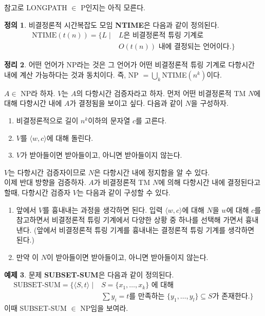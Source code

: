 \documentclass[b5paper, 11pt]{book}
\theoremstyle{definition}
\newtheorem{defn}{정의}[chapter]
\newtheorem{thm}[defn]{정리}
\newtheorem{ex}[defn]{예제}
\newenvironment{pf*}{\pushQED{\qed}\pf}
{\popQED\endpf}
\begin{document}
참고로 LONGPATH $\in $ P인지는 아직 모른다.
\begin{defn}
    비결정론적 시간복잡도 모임 \textbf{NTIME}은 다음과 같이 정의된다. 
    \begin{align*}
        \text{NTIME}(t(n)) = \{L \;\vert\; &L\text{은 비결정론적 튜링 기계로 } \\ &O(t(n)) \text{ 내에 
        결정되는 언어이다.} \}
    \end{align*}
\end{defn}
\begin{thm}
    어떤 언어가 NP라는 것은 그 언어가 어떤 비결정론적 튜링 기계로 다항시간 내에 계산 가능하다는 것과 동치이다.
    즉, NP $= \bigcup_k$NTIME$(n^k)$이다.
\end{thm}
\begin{pf*}
    $A \in $ NP라 하자. $V$는 $A$의 다항시간 검증자라고 하자. 
    먼저 어떤 비결정론적 TM $N$에 대해 다항시간 내에 $A$가 결정됨을 보이고 싶다.
    다음과 같이 $N$을 구성하자.
    \begin{enumerate}
        \item 비결정론적으로 길이 $n^k$이하의 문자열 $c$를 고른다.
        \item $V$를 $\langle w,c \rangle$에 대해 돌린다.
        \item $V$가 받아들이면 받아들이고, 아니면 받아들이지 않는다. 
    \end{enumerate}
    $V$는 다항시간 검증자이므로 $N$은 다항시간 내에 정지함을 알 수 있다. \\ 
    이제 반대 방향을 검증하자. $A$가 비결정론적 TM $N$에 의해 다항시간 내에 결정된다고 할때, 다항시간
    검증자 $V$는 다음과 같이 구성할 수 있다.
    \begin{enumerate}
        \item 앞에서 $V$를 흉내내는 과정을 생각하면 된다. 입력 $\langle w,c \rangle$에 대해 $N$을 $w$에
        대해 $c$를 참고하면서 비결정론적 튜링 기계에서 다양한 상황 중 하나를 선택해 가면서 흉내낸다. (앞에서
        비결정론적 튜링 기계를 흉내내는 결정론적 튜링 기계를 생각하면 된다.) 
        \item 만약 이 $N$이 받아들이면 받아들이고, 아니면 받아들이지 않는다.
    \end{enumerate}
\end{pf*}
\begin{ex}
    문제 \textbf{SUBSET-SUM}은 다음과 같이 정의된다. 
    \begin{align*}
        \text{SUBSET-SUM} = \{\langle S, t \rangle \; \vert \; &S = \{x_1, \ldots , x_k\} \text{ 에 대해 }
        \\ &\sum y_i = t \text{를 만족하는 }\{y_1, \ldots, y_l \} \subseteq S  \text{가 존재한다.} \}
    \end{align*}
    이때 SUBSET-SUM $\in$ NP임을 보여라.
\end{ex}
\end{document}
